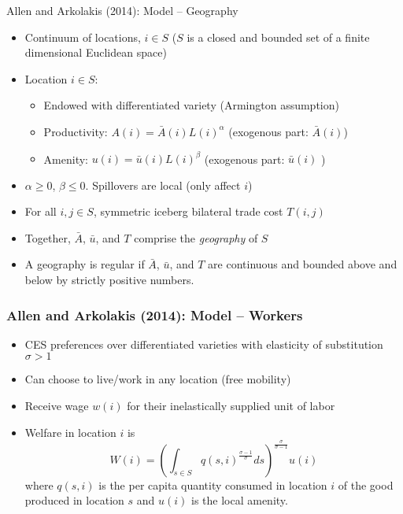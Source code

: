 \documentclass[10pt,notes=hide]{beamer}
\begin{document}
\begin{frame}{Allen and Arkolakis (2014): Model -- Geography}
\begin{itemize}
\item Continuum of locations, $i \in S$ ($S$ is a closed and bounded set of a finite dimensional Euclidean space) 
\item Location $i \in S$:
\begin{itemize}
\item Endowed with differentiated variety (Armington assumption)
\item Productivity: $A(i) = \bar{A}(i) L(i)^\alpha$ (exogenous part: $\bar{A}(i)$)
\item Amenity: $u(i) = \bar{u}\left(i\right) L(i)^\beta $ (exogenous part: $\bar{u}(i)$ )
\end{itemize}
\item $\alpha \geq 0$, $\beta \leq 0$. Spillovers are local (only affect $i$)
\item For all $i,j \in S$, symmetric iceberg bilateral trade cost $T\left(i,j\right)$
\item Together, $\bar{A}$, $\bar{u}$, and $T$ comprise the \textit{geography} of $S$
\item A geography is regular if $\bar{A}$, $\bar{u}$, and $T$ are continuous and bounded above and below by strictly positive numbers.
\end{itemize}
\end{frame}
\begin{frame}
\frametitle{Allen and Arkolakis (2014): Model -- Workers}
\begin{itemize}
\item CES preferences over differentiated varieties with elasticity of substitution $\sigma>1$
\item Can choose to live/work in any location (free mobility)
\item Receive wage $w\left(i\right)$ for their inelastically supplied unit of labor
 \item Welfare in location $i$ is
\begin{equation*}
W\left(i\right)=\left(\int_{s\in S}q\left(s,i\right)^{\frac{\sigma-1}{\sigma}}ds\right)^{\frac{\sigma}{\sigma-1}}u\left(i\right)
\end{equation*}
 where $q\left(s,i\right)$ is the per capita quantity consumed in location $i$ of the good produced in location $s$ and $u\left(i\right)$ is the local amenity.
\end{itemize}
\end{frame}
\end{document}
